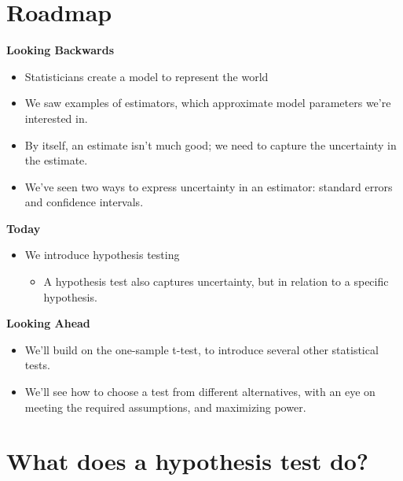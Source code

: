 \documentclass[
]{book}
\providecommand{\tightlist}{%
  \setlength{\itemsep}{0pt}\setlength{\parskip}{0pt}}
\theoremstyle{definition}
\theoremstyle{definition}
\theoremstyle{definition}
\theoremstyle{definition}
\theoremstyle{remark}
\begin{document}
\hypertarget{roadmap-2}{%
\section{Roadmap}\label{roadmap-2}}

\textbf{Looking Backwards}

\begin{itemize}
\tightlist
\item
  Statisticians create a model to represent the world
\item
  We saw examples of estimators, which approximate model parameters we're interested in.
\item
  By itself, an estimate isn't much good; we need to capture the uncertainty in the estimate.
\item
  We've seen two ways to express uncertainty in an estimator: standard errors and confidence intervals.
\end{itemize}

\textbf{Today}

\begin{itemize}
\tightlist
\item
  We introduce hypothesis testing

  \begin{itemize}
  \tightlist
  \item
    A hypothesis test also captures uncertainty, but in relation to a specific hypothesis.
  \end{itemize}
\end{itemize}

\textbf{Looking Ahead}

\begin{itemize}
\tightlist
\item
  We'll build on the one-sample t-test, to introduce several other statistical tests.
\item
  We'll see how to choose a test from different alternatives, with an eye on meeting the required assumptions, and maximizing power.
\end{itemize}

\hypertarget{what-does-a-hypothesis-test-do}{%
\section{What does a hypothesis test do?}\label{what-does-a-hypothesis-test-do}}
\end{document}
